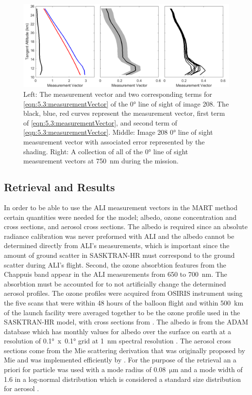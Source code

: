 \begin{figure}
\includegraphics[width=1.0\textwidth]{./Images/5-3-MeasurementVectorsComparisons.pdf}
    \caption[ALI Measurement Vectors]{Left: The measurement vector and two corresponding terms for \autoref{eqn:5.3:measurementVector} of the 0\si{\degree} line of sight of image 208. The black, blue, red curves represent the measurement vector, first term of \autoref{eqn:5.3:measurementVector}, and second term of \autoref{eqn:5.3:measurementVector}. Middle: Image 208 0\si{\degree} line of sight measurement vector with associated error represented by the shading. Right: A collection of all of the 0\si{\degree} line of sight measurement vectors at 750~nm during the mission.}
    \label{fig:5.3:measurementVectors}
\end{figure}

\subsection{Retrieval and Results}

In order to be able to use the ALI measurement vectors in the MART method certain quantities were needed for the model; albedo, ozone concentration and cross sections, and aerosol cross sections. The albedo is required since an absolute radiance calibration was never preformed with ALI and the albedo cannot be determined directly from ALI's measurements, which is important since the amount of ground scatter in SASKTRAN-HR must correspond to the ground scatter during ALI's flight. Second, the ozone absorbtion features from the Chappuis band appear in the ALI measurements from 650 to 700~nm. The absorbtion must be accounted for to not artificially change the determined aerosol profiles. The ozone profiles were acquired from OSIRIS instrument using the five scans that were within 48 hours of the balloon flight and within 500~km of the launch facility were averaged together to be the ozone profile used in the SASKTRAN-HR model, with cross sections from \cite{Burrows1999}. The albedo is from the ADAM database which has monthly values for albedo over the surface on earth at a resolution of 0.1\si{\degree}~x~0.1\si{\degree} grid at 1~nm spectral resolution \citep{Muller2013}. The aerosol cross sections come from the Mie scattering derivation that was originally proposed by Mie and was implemented efficiently by \cite{Wiscombe1980}. For the purpose of the retrieval an a priori for particle was used with a mode radius of 0.08~$\si{\micro\metre}$  and a mode width of 1.6 in a log-normal distribution which is considered a standard size distribution for aerosol \citep{Deshler2003}.

